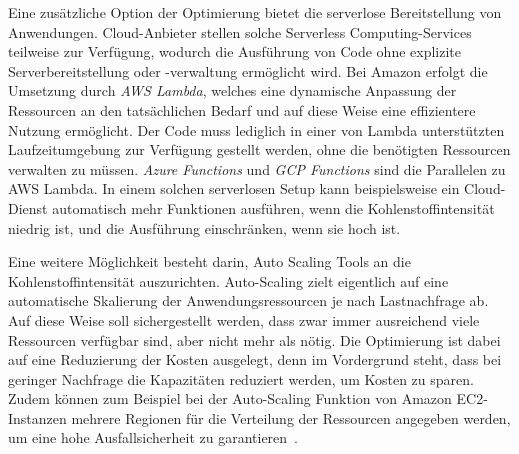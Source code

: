 Eine zusätzliche Option der Optimierung bietet die serverlose Bereitstellung von Anwendungen.
Cloud-Anbieter stellen solche Serverless Computing-Services teilweise zur Verfügung, wodurch die Ausführung von Code ohne explizite Serverbereitstellung oder -verwaltung ermöglicht wird.
Bei Amazon erfolgt die Umsetzung durch \textit{AWS Lambda}, welches eine dynamische Anpassung der Ressourcen an den tatsächlichen Bedarf und auf diese Weise eine effizientere Nutzung ermöglicht.
Der Code muss lediglich in einer von Lambda unterstützten Laufzeitumgebung zur Verfügung gestellt werden, ohne die benötigten Ressourcen verwalten zu müssen.
\textit{Azure Functions} und \textit{\ac{GCP} Functions} sind die Parallelen zu \ac{AWS} Lambda.
In einem solchen serverlosen Setup kann beispielsweise ein Cloud-Dienst automatisch mehr Funktionen ausführen, wenn die Kohlenstoffintensität niedrig ist, und die Ausführung einschränken, wenn sie hoch ist.


Eine weitere Möglichkeit besteht darin, Auto Scaling Tools an die Kohlenstoffintensität auszurichten.
Auto-Scaling zielt eigentlich auf eine automatische Skalierung der Anwendungsressourcen je nach Lastnachfrage ab.
Auf diese Weise soll sichergestellt werden, dass zwar immer ausreichend viele Ressourcen verfügbar sind, aber nicht mehr als nötig.
Die Optimierung ist dabei auf eine Reduzierung der Kosten ausgelegt, denn im Vordergrund steht, dass bei geringer Nachfrage die Kapazitäten reduziert werden, um Kosten zu sparen.
Zudem können zum Beispiel bei der Auto-Scaling Funktion von Amazon EC2-Instanzen mehrere Regionen für die Verteilung der Ressourcen angegeben werden, um eine hohe Ausfallsicherheit zu garantieren~\cite{AmazonWebServices.20240229}.


